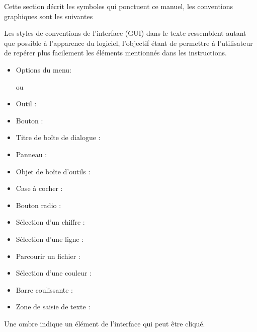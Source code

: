 \label{label_conventions}

Cette section décrit les symboles qui ponctuent ce manuel, les conventions graphiques sont les suivantes


Les styles de conventions de l'interface (GUI) dans le texte ressemblent autant que possible à l'apparence du logiciel, l'objectif étant de permettre à l'utilisateur de repérer plus facilement les éléments mentionnés dans les instructions.

\begin{itemize}[label=--,itemsep=5pt]
\item Options du menu:  \arrow
{}

ou

 \arrow
{} \arrow {}
\item Outil : 
\item Bouton : 
\item Titre de boîte de dialogue : 
\item Panneau : 

% 
% 
% 
% 
% 
\item Objet de boîte d'outils :  
\item Case à cocher : 
\item Bouton radio :   
\item Sélection d'un chiffre : 
\item Sélection d'une ligne : 
\item Parcourir un fichier : \browsebutton 
\item Sélection d'une couleur : 
\item Barre coulissante : 
\item Zone de saisie de texte : 
\end{itemize}
Une ombre indique un élément de l'interface qui peut être cliqué.

